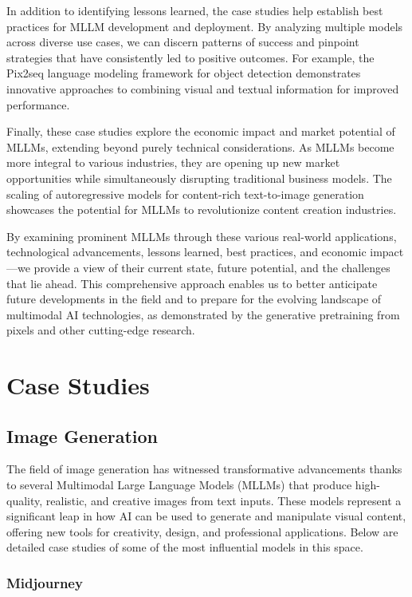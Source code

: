 In addition to identifying lessons learned, the case studies help establish best practices for MLLM development and deployment. By analyzing multiple models across diverse use cases, we can discern patterns of success and pinpoint strategies that have consistently led to positive outcomes. For example, the Pix2seq language modeling framework for object detection \cite{chen2023pix2seq} demonstrates innovative approaches to combining visual and textual information for improved performance.

Finally, these case studies explore the economic impact and market potential of MLLMs, extending beyond purely technical considerations. As MLLMs become more integral to various industries, they are opening up new market opportunities while simultaneously disrupting traditional business models. The scaling of autoregressive models for content-rich text-to-image generation \cite{yu2022scaling} showcases the potential for MLLMs to revolutionize content creation industries.

By examining prominent MLLMs through these various real-world applications, technological advancements, lessons learned, best practices, and economic impact—we provide a view of their current state, future potential, and the challenges that lie ahead. This comprehensive approach enables us to better anticipate future developments in the field and to prepare for the evolving landscape of multimodal AI technologies, as demonstrated by the generative pretraining from pixels \cite{chen2023generative} and other cutting-edge research.


\section{Case Studies}

\subsection{Image Generation}

The field of image generation has witnessed transformative advancements thanks to several Multimodal Large Language Models (MLLMs) that produce high-quality, realistic, and creative images from text inputs. These models represent a significant leap in how AI can be used to generate and manipulate visual content, offering new tools for creativity, design, and professional applications. Below are detailed case studies of some of the most influential models in this space.

\subsubsection{Midjourney}

